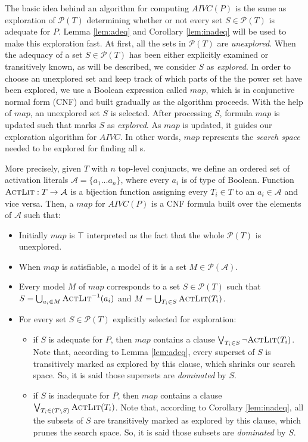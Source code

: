 The basic idea behind an algorithm for computing $AIVC(P)$ is the same as exploration of $\mathcal{P}(T)$ determining whether or not every set $S \in \mathcal{P}(T)$ is adequate for $P$.
Lemma \ref{lem:adeq} and Corollary \ref{lem:inadeq} will be used to make this exploration fast.
At first, all the sets in $\mathcal{P}(T)$ are \emph{unexplored}. When the adequacy of a set $S \in \mathcal{P}(T)$ has been either explicitly examined
or transitively known, as will be described, we consider $S$ as \emph{explored}.
In order to choose an unexplored set and keep track of which parts of the the power set
have been explored, we use a Boolean expression called $map$, which is
in conjunctive normal form (CNF) and built gradually as the algorithm proceeds.
With the help of $map$, an unexplored set $S$ is selected. After processing $S$,
formula $map$ is updated such that marks $S$ as \emph{explored}.
As $map$ is updated, it guides our exploration algorithm for $AIVC$.
In other words, $map$ represents the \emph{search space} needed to be explored for finding all \mivc s.

More precisely, given $T$ with $n$ top-level conjuncts,
we define an ordered
set of activation literals $\mathcal{A} = \{a_1...a_n\}$, where every $a_i$ is of type of Boolean. Function $\textsc{ActLit} : T \rightarrow \mathcal{A}$
is a bijection function assigning every $T_i \in T$ to an $a_i \in \mathcal{A}$ and vice versa.
Then, a $map$ for $AIVC(P)$ is a CNF formula built over the elements of $\mathcal{A}$ such that:
\begin{itemize}
  \item Initially $map$ is $\top$ interpreted as the fact that the whole $\mathcal{P}(T)$ is unexplored.
  \item When $map$ is satisfiable, a model of it is a set
  $M \in \mathcal{P}(\mathcal{A})$.
  \item Every model $M$ of $map$ corresponds to a set $S \in \mathcal{P}(T)$ such that
$S = \bigcup_{a_i \in M} \textsc{ActLit} ^{-1} (a_i)$ and $M = \bigcup_{T_i \in S} \textsc{ActLit}(T_i)$.
\vspace{0.05in}
  \item For every set $S \in \mathcal{P}(T)$ explicitly selected for exploration:
  \begin{itemize}
    \item if $S$ is adequate for $P$, then $map$ contains a clause $\bigvee_{T_{i}\in S} \neg {\textsc{ActLit}(T_i)}$. Note that, according to Lemma \ref{lem:adeq}, every superset of $S$ is transitively marked as explored by this clause, which shrinks our search space. So, it is said those supersets are \emph{dominated} by $S$.
    \item if $S$ is inadequate for $P$, then $map$ contains a clause $\bigvee_{T_{i}\in (T \setminus S)} \textsc{ActLit} (T_i)$. Note that, according to Corollary \ref{lem:inadeq}, all the subsets of $S$ are transitively marked as explored by this clause, which prunes the search space. So, it is said those subsets are \emph{dominated} by $S$.
  \end{itemize}
\end{itemize}


